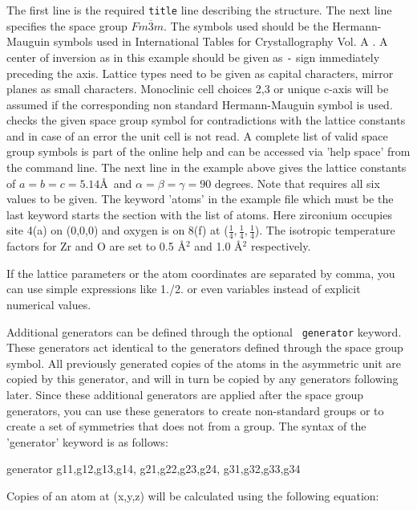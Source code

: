 The first line is the required {\tt title} line describing the
structure. The next line specifies the space group
$Fm\overline{3}m$.  The symbols used should be the Hermann-Mauguin
symbols used in International Tables for Crystallography Vol.  A
\cite{tables}.  A center of inversion as in this example should be
given as {\tt -} sign immediately preceding the axis. Lattice types need
to be given as capital characters, mirror planes as small
characters.  Monoclinic cell choices 2,3 or unique c-axis will be
assumed if the corresponding non standard Hermann-Mauguin symbol is
used. \Discus checks the given space group symbol for
contradictions with the lattice constants and in case of an error
the unit cell is not read.  A complete list of valid space group
symbols is part of the online help and can be accessed via 'help
space' from the \Discus command line.  The next line in the
example above gives the lattice constants of $a=b=c=5.14$\AA \ and
$\alpha=\beta=\gamma=90$ degrees.  Note that \Discus requires
all six values to be given.  The keyword 'atoms' in the example file
which must be the last keyword starts the section with the list of
atoms.  Here zirconium occupies site 4(a) on (0,0,0) and oxygen is
on 8(f) at ($\frac{1}{4}, \frac{1}{4}, \frac{1}{4}$).  The isotropic
temperature factors for Zr and O are set to 0.5 \AA$^{2}$ and 1.0
\AA$^{2}$ respectively. \par

If the lattice parameters or the atom coordinates are separated
by comma, you can use simple expressions like 1./2. or even 
variables instead of explicit numerical values. \par

Additional generators can be defined through the optional {\tt
generator} keyword.  These generators act identical to the
generators defined through the space group symbol.  All previously
generated copies of the atoms in the asymmetric unit are copied by
this generator, and will in turn be copied by any generators
following later.  Since these additional generators are applied
after the space group generators, you can use these generators to
create non-standard groups or to create a set of symmetries that
does not from a group. The syntax of the 'generator' keyword is as
follows:

\begin{MacVerbatim}
    generator g11,g12,g13,g14, g21,g22,g23,g24, g31,g32,g33,g34
\end{MacVerbatim}

Copies of an atom at (x,y,z) will be calculated using the following
equation:

